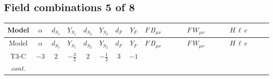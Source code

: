 \documentclass[8pt]{article}
\begin{document}
\begin{landscape}
\subsection*{Field combinations 5 of 8}
\begin{longtable}{@{}cccccccc >{\raggedright\arraybackslash}p{0.21\linewidth} >{\raggedright\arraybackslash}p{0.21\linewidth} >{\raggedright\arraybackslash}p{0.21\linewidth}@{}}
\toprule
Model & $\alpha$ & $d_{S_1}$ & $Y_{S_1}$ & $d_{S_2}$ & $Y_{S_2}$ & $d_F$ & $Y_F$ & $F\,B_{\mu\nu}$ & $F\,W_{\mu\nu}$ & $H\,\ell\,e$ \\
\midrule
\endfirsthead
\toprule
Model & $\alpha$ & $d_{S_1}$ & $Y_{S_1}$ & $d_{S_2}$ & $Y_{S_2}$ & $d_F$ & $Y_F$ & $F\,B_{\mu\nu}$ & $F\,W_{\mu\nu}$ & $H\,\ell\,e$ \\
\midrule
\endhead
T3-C & $-3$ & $2$ & $-\frac{3}{2}$ & $2$ & $-\frac{1}{2}$ & $3$ & $-1$ & \scriptsize\adjustbox{max width=\linewidth}{$\begin{gathered} -3 \hbar  \log \left(\frac{\bar{\mu}^{2}}{M_F^2}\right) B_{\mu _1\mu _2}^2\end{gathered}$} & \scriptsize\adjustbox{max width=\linewidth}{$\begin{gathered} -2 \hbar  \log \left(\frac{\bar{\mu}^{2}}{M_F^2}\right) \left(W_{\mu _1\mu _2}^{A_1}\right){}^2\end{gathered}$} & \scriptsize\adjustbox{max width=\linewidth}{$\begin{gathered} +\frac{\sqrt{3} \hbar  \overline{y_{1,i_3,r_1}} \overline{L_{a_1,i_2}}\, P_R\, e_{i_1} H_{a_1} y_{1,i_2,r_1} Y_{e,i_3,i_1}}{4 \epsilon } \\ +\frac{3}{8} \sqrt{3} \hbar  \overline{y_{1,i_3,r_1}} \overline{L_{a_1,i_2}}\, P_R\, e_{i_1} H_{a_1} y_{1,i_2,r_1} Y_{e,i_3,i_1} \\ +\frac{\sqrt{3} \hbar  \overline{y_{2,i_3,r_1}} \overline{L_{a_1,i_2}}\, P_R\, e_{i_1} H_{a_1} y_{2,i_2,r_1} Y_{e,i_3,i_1}}{4 \epsilon }\end{gathered}$} \\
\textit{cont.} &  &  &  &  &  &  &  &  &  & \scriptsize\adjustbox{max width=\linewidth}{$\begin{gathered} +\frac{3}{8} \sqrt{3} \hbar  \overline{y_{2,i_3,r_1}} \overline{L_{a_1,i_2}}\, P_R\, e_{i_1} H_{a_1} y_{2,i_2,r_1} Y_{e,i_3,i_1} \\ +\frac{\sqrt{3} \hbar  \overline{y_{1,i_1,r_1}} \overline{Y_{e,i_3,i_2}} \overline{e_{i_2}}\, P_L\, L_{a_1,i_1} y_{1,i_3,r_1} H_{a_1}{}^{\dagger }}{4 \epsilon } \\ +\frac{3}{8} \sqrt{3} \hbar  \overline{y_{1,i_1,r_1}} \overline{Y_{e,i_3,i_2}} \overline{e_{i_2}}\, P_L\, L_{a_1,i_1} y_{1,i_3,r_1} H_{a_1}{}^{\dagger }\end{gathered}$} \\

\end{longtable}
\end{landscape}
\end{document}
